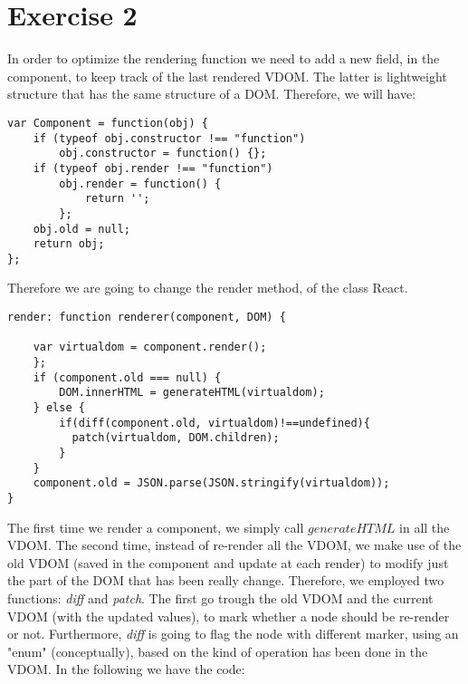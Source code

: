 \documentclass[10pt]{article}
\begin{document}
\section*{Exercise 2}
In order to optimize the rendering function we need to add a new field, in the component, to keep track of the last rendered VDOM. The latter is lightweight structure that has the same structure of a DOM. Therefore, we will have:
\begin{lstlisting}[caption=Keep the old VDOM in the component]
var Component = function(obj) {
    if (typeof obj.constructor !== "function")
        obj.constructor = function() {};
    if (typeof obj.render !== "function")
        obj.render = function() {
            return '';
        };
    obj.old = null;
    return obj;
};
\end{lstlisting}
Therefore we are going to change the render method, of the class React.   
\begin{lstlisting}[caption=New render method]
render: function renderer(component, DOM) {

    var virtualdom = component.render();
    };
    if (component.old === null) {
        DOM.innerHTML = generateHTML(virtualdom);
    } else {
        if(diff(component.old, virtualdom)!==undefined){
          patch(virtualdom, DOM.children);
        }
    }
    component.old = JSON.parse(JSON.stringify(virtualdom));
}
\end{lstlisting}
The first time we render a component, we simply call $generateHTML$ in all the VDOM. The second time, instead of re-render all the VDOM, we make use of the old VDOM (saved in the component and update at each render) to modify just the part of the DOM that has been really change. Therefore, we employed two functions: \textit{diff}  and \textit{patch}. The first go trough the old VDOM and the current VDOM (with the updated values), to mark whether a node should be re-render or not. Furthermore, \textit{diff} is going to flag the node with different marker, using an "enum" (conceptually), based on the kind of operation has been done in the VDOM. In the following we have the code: 
\end{document}
